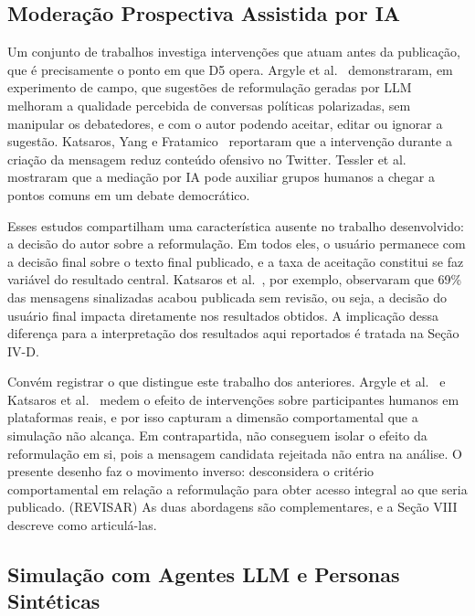 \documentclass[conference]{IEEEtran} \IEEEoverridecommandlockouts %
\begin{document}
\subsection{Moderação Prospectiva Assistida por IA}

Um conjunto de trabalhos investiga intervenções que atuam antes da publicação,
que é precisamente o ponto em que D5 opera. Argyle et
al.~\cite{argyle2023leveraging} demonstraram, em experimento de campo, que
sugestões de reformulação geradas por LLM melhoram a qualidade percebida de
conversas políticas polarizadas, sem manipular os debatedores, e com o autor podendo aceitar, editar ou ignorar a sugestão. Katsaros, Yang e Fratamico~\cite{katsaros2022reconsidering}
reportaram que a intervenção durante a criação da mensagem reduz conteúdo
ofensivo no Twitter. Tessler et al.~\cite{tessler2024ai} mostraram que a
mediação por IA pode auxiliar grupos humanos a chegar a pontos comuns em um debate democrático.

Esses estudos compartilham uma característica ausente no trabalho desenvolvido: a
decisão do autor sobre a reformulação. Em todos eles, o usuário permanece
com a decisão final sobre o texto final publicado, e a taxa de aceitação constitui se faz variável do resultado central. Katsaros et al.~\cite{katsaros2022reconsidering}, por
exemplo, observaram que 69\% das mensagens sinalizadas acabou publicada
sem revisão, ou seja, a decisão do usuário final impacta diretamente nos resultados obtidos. A implicação dessa diferença para a interpretação dos resultados
aqui reportados é tratada na Seção IV-D.

Convém registrar o que distingue este trabalho dos anteriores. Argyle et
al.~\cite{argyle2023leveraging} e Katsaros et
al.~\cite{katsaros2022reconsidering} medem o efeito de intervenções sobre
participantes humanos em plataformas reais, e por isso capturam a dimensão
comportamental que a simulação não alcança. Em contrapartida, não conseguem
isolar o efeito da reformulação em si, pois a mensagem candidata rejeitada não
entra na análise. O presente desenho faz o movimento inverso: desconsidera o critério comportamental em relação a reformulação para obter acesso integral ao que seria publicado.
(REVISAR)
As duas abordagens são complementares, e a Seção VIII descreve como articulá-las.
 
\subsection{Simulação com Agentes LLM e Personas Sintéticas}
\end{document}
